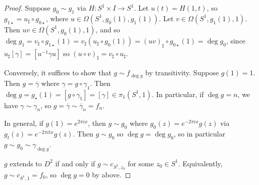 \begin{proof}
	Suppose \( g_0 \sim g_1 \) via \( H \colon S^1 \times I \to S^1 \).
	Let \( u(t) = H(1,t) \), so \( g_{1\star} = u_\sharp \circ g_{0\star} \), where \( u \in \Omega(S^1,g_0(1),g_1(1)) \).
	Let \( v \in \Omega(S^1,g_1(1),1) \).
	Then \( uv \in \Omega(S^1,g_0(1),1) \), and so \( \deg g_1 = v_\sharp \circ g_{1\star}(1) = v_\sharp(u_\sharp\circ g_0(1)) = (uv)_\sharp \circ g_{0\star}(1) = \deg g_0 \), since \( u_\sharp[\gamma] = [u^{-1}\gamma u] \) so \( (u \circ v)_\sharp = v_\sharp \circ u_\sharp \).

	Conversely, it suffices to show that \( g \sim f_{\deg g} \) by transitivity.
	Suppose \( g(1) = 1 \).
	Then \( g = \overline \gamma \) where \( \gamma = g \circ \gamma_1 \).
	Then \( \deg g = g_\star(1) = [g \circ \gamma_1] = [\gamma] \in \pi_1(S^1,1) \).
	In particular, if \( \deg g = n \), we have \( \gamma \sim \gamma_n \), so \( g = \overline \gamma \sim \overline \gamma_n = f_n \).

	In general, if \( g(1) = e^{2\pi i x} \), then \( g \sim g_0 \) where \( g_0(z) = e^{-2\pi i x}g(z) \) via \( g_t(z) = e^{-2\pi i t x}g(z) \).
	Then \( g \sim g_0 \) so \( \deg g = \deg g_0 \), so in particular \( g \sim g_0 \sim \gamma_{\deg g} \).

	\( g \) extends to \( D^2 \) if and only if \( g \sim c_{S^1,z_0} \) for some \( z_0 \in S^1 \).
	Equivalently, \( g \sim c_{S^1,1} = f_0 \), so \( \deg g = 0 \) by above.
\end{proof}

